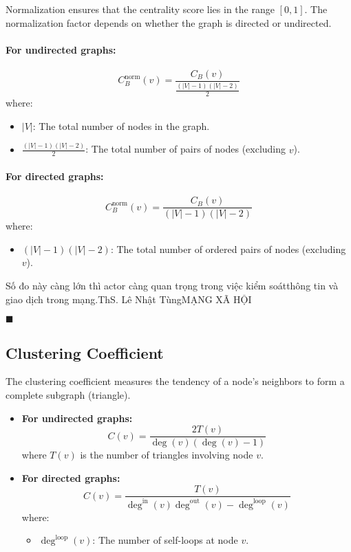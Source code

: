 \documentclass[12pt, a4paper,oneside]{book}
\newenvironment{luuy}{\fontfamily{bch}\HandPencilLeft \selectfont{\textbf{ Note.}} \normalfont}{ \hfill \ensuremath{\blacksquare}}
\begin{document}
Normalization ensures that the centrality score lies in the range \([0, 1]\). The normalization factor depends on whether the graph is directed or undirected.

\paragraph{For undirected graphs:}
\[
C_B^{\text{norm}}(v) = \frac{C_B(v)}{\frac{(|V| - 1)(|V| - 2)}{2}}
\]
where:
\begin{itemize}
    \item \( |V| \): The total number of nodes in the graph.
    \item \( \frac{(|V| - 1)(|V| - 2)}{2} \): The total number of pairs of nodes (excluding \( v \)).
\end{itemize}

\paragraph{For directed graphs:}
\[
C_B^{\text{norm}}(v) = \frac{C_B(v)}{(|V| - 1)(|V| - 2)}
\]
where:
\begin{itemize}
    \item \( (|V| - 1)(|V| - 2) \): The total number of ordered pairs of nodes (excluding \( v \)).
\end{itemize}

\begin{luuy}
    Số đo này càng lớn thì actor càng quan trọng trong việc kiểm soátthông tin và giao dịch trong mạng.ThS. Lê Nhật TùngMẠNG XÃ HỘI

\end{luuy}

\subsection{Clustering Coefficient}
The clustering coefficient measures the tendency of a node's neighbors to form a complete subgraph (triangle).

\begin{itemize}
    \item \textbf{For undirected graphs:}
    \[
    C(v) = \frac{2T(v)}{\deg(v)(\deg(v) - 1)}
    \]
    where \( T(v) \) is the number of triangles involving node \( v \).

    \item \textbf{For directed graphs:}
    \[
    C(v) = \frac{T(v)}{\deg^{\text{in}}(v) \deg^{\text{out}}(v) - \deg^{\text{loop}}(v)}
    \]
    where:
    \begin{itemize}
        \item \( \deg^{\text{loop}}(v) \): The number of self-loops at node \( v \).
    \end{itemize}
\end{itemize}
\end{document}
